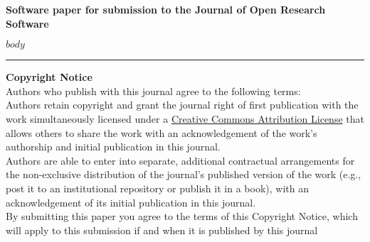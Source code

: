 \documentclass{jors}
\begin{document}
{\bf Software paper for submission to the Journal of Open Research Software}

$body$

\vspace{2cm}

\rule{\textwidth}{1pt}





{ \bf Copyright Notice} \\
Authors who publish with this journal agree to the following terms: \\

Authors retain copyright and grant the journal right of first publication with the work simultaneously licensed under a  \href{http://creativecommons.org/licenses/by/3.0/}{Creative Commons Attribution License} that allows others to share the work with an acknowledgement of the work's authorship and initial publication in this journal. \\

Authors are able to enter into separate, additional contractual arrangements for the non-exclusive distribution of the journal's published version of the work (e.g., post it to an institutional repository or publish it in a book), with an acknowledgement of its initial publication in this journal. \\

By submitting this paper you agree to the terms of this Copyright Notice, which will apply to this submission if and when it is published by this journal
\end{document}
